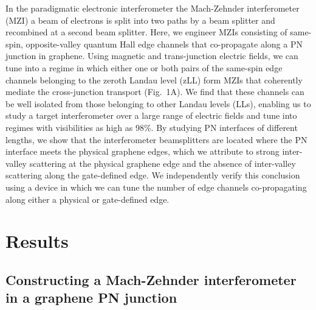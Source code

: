 \documentclass[%
reprint,amsmath,amssymb,aps,prl,superscriptaddress,
twocolumn
]{revtex4-1}
\begin{document}
	In the paradigmatic electronic interferometer \textemdash{} the Mach-Zehnder interferometer (MZI) \cite{Ji2003} \textemdash{} a beam of electrons is split into two paths by a beam splitter and recombined at a second beam splitter.  Here, we engineer MZIs consisting of same-spin, opposite-valley quantum Hall edge channels that co-propagate along a PN junction in graphene. Using magnetic and trans-junction electric fields, we can tune into a regime in which either one or both pairs of the same-spin edge channels belonging to the zeroth Landau level (zLL) form MZIs that coherently mediate the cross-junction transport (Fig.~1A). We find that these channels can be well isolated from those belonging to other Landau levels (LLs), enabling us to study a target interferometer over a large range of electric fields and tune into regimes with visibilities as high as 98$\%$. By studying PN interfaces of different lengths, we show that the interferometer beamsplitters are located where the PN interface meets the physical graphene edges, which we attribute to strong inter-valley scattering at the physical graphene edge and the absence of inter-valley scattering along the gate-defined edge. We independently verify this conclusion using a device in which we can tune the number of edge channels co-propagating along either a physical or gate-defined edge.
	\section{Results}
	\subsection{Constructing a Mach-Zehnder interferometer in a graphene PN junction}
	
\end{document}
